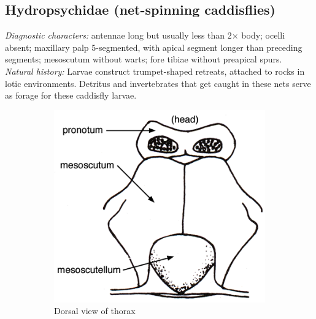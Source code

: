 \documentclass[letterpaper, 11pt]{article}
\begin{document}
\subsection{Hydropsychidae (net-spinning caddisflies)}
\noindent{}\textit{Diagnostic characters:} antennae long but usually less than 2$\times$ body; ocelli absent; maxillary palp 5-segmented, with apical segment longer than preceding segments; mesoscutum without warts; fore tibiae without preapical spurs.\\

\noindent{}\textit{Natural history:} Larvae construct trumpet-shaped retreats, attached to rocks in lotic environments. Detritus and invertebrates that get caught in these nets serve as forage for these caddisfly larvae. 

\begin{figure}[ht!]
    \centering
    \begin{subfigure}[ht!]{0.36\textwidth}
        \includegraphics[width=\textwidth]{TrichoImage03}
        \caption{Dorsal view of thorax \citep[][Fig. 80]{bhl50956}}
        \label{fig:hydropsychid1}
    \end{subfigure}
    \hfill %
    \begin{subfigure}[ht!]{0.4\textwidth}

\end{subfigure}
\end{figure}
\end{document}
